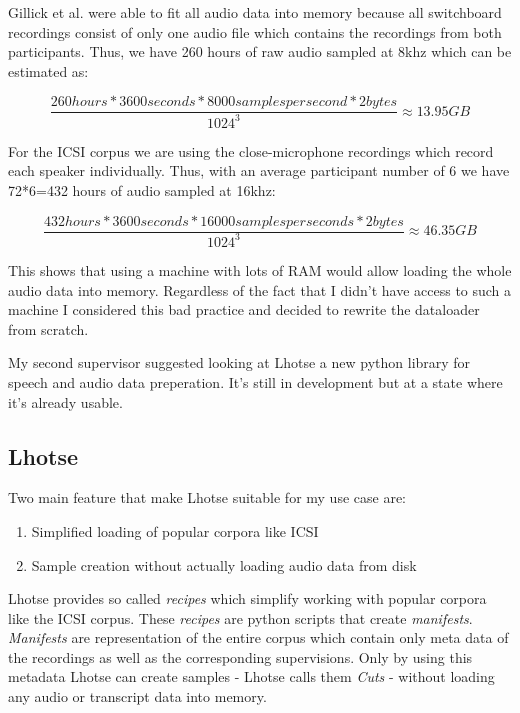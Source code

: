 \documentclass[bsc,frontabs,parskip,deptreport]{infthesis}
\begin{document}
Gillick et al. were able to fit all audio data into memory because all switchboard recordings consist of only one audio file which contains the recordings from both participants. Thus, we have 260 hours of raw audio sampled at 8khz which can be estimated as:

\[ \frac{260hours * 3600 seconds * 8000 samples per second * 2 bytes}{1024^3} \approx 13.95 GB \]

For the ICSI corpus we are using the close-microphone recordings which record each speaker individually. Thus, with an average participant number of 6 we have 72*6=432 hours of audio sampled at 16khz:

\[ \frac{432 hours * 3600 seconds * 16000 samples per seconds * 2bytes}{1024^3} \approx 46.35 GB \]

This shows that using a machine with lots of RAM would allow loading the whole audio data into memory. 
Regardless of the fact that I didn't have access to such a machine I considered this bad practice and decided to rewrite the dataloader from scratch. 

My second supervisor suggested looking at Lhotse \cite{zelasko2021lhotse} a new python library for speech and audio data preperation. It's still in development but at a state where it's already usable.

\subsection{Lhotse}
Two main feature that make Lhotse suitable for my use case are:
\begin{enumerate}
    \item Simplified loading of popular corpora like ICSI
    \item Sample creation without actually loading audio data from disk
\end{enumerate}

Lhotse provides so called \textit{recipes} which simplify working with popular corpora like the ICSI corpus.
These \textit{recipes} are python scripts that create \textit{manifests}.
\textit{Manifests} are representation of the entire corpus which contain only meta data of the recordings as well as the corresponding supervisions. 
Only by using this metadata Lhotse can create samples - Lhotse calls them \textit{Cuts} - without loading any audio or transcript data into memory. 
\end{document}
